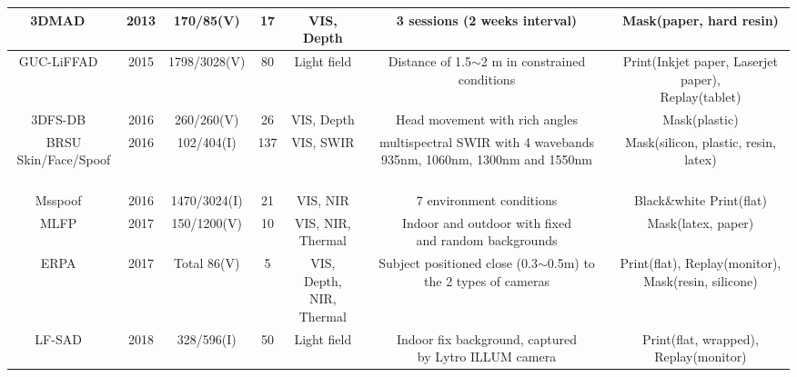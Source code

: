 \documentclass[10pt,journal,compsoc]{IEEEtran}
\begin{document}
\begin{table}
{\begin{tabular}{c c c c c c c}
 \midrule[1pt]
 \midrule[1pt]
 
3DMAD
~\cite{erdogmus2014spoofing} & 2013 & 170/85(V) & 17 & VIS, Depth &  3 sessions (2 weeks
interval)  & Mask(paper, hard resin)\\

 \midrule
GUC-LiFFAD
~\cite{raghavendra2015presentation} & 2015 & 1798/3028(V) & 80 & Light field &  \tabincell{c}{Distance of 1.5$\sim$2 m in \\constrained conditions}  & \tabincell{c}{Print(Inkjet paper, Laserjet paper),\\ Replay(tablet)}\\

\midrule
3DFS-DB
~\cite{galbally2016three} & 2016 & 260/260(V) & 26 & VIS, Depth &  Head movement with rich angles & Mask(plastic)\\

 \midrule
\tabincell{c}{BRSU \\ Skin/Face/Spoof}
~\cite{steiner2016reliable} & 2016 & 102/404(I) & 137 & VIS, SWIR &  \tabincell{c}{ multispectral SWIR with 4 wavebands \\935nm, 1060nm, 1300nm and 1550nm} & Mask(silicon, plastic, resin, latex)\\

 \midrule
Msspoof
~\cite{chingovska2016face} & 2016 & 1470/3024(I) & 21 & VIS, NIR &  7 environment conditions & Black\&white Print(flat)\\


 \midrule
MLFP
~\cite{agarwal2017face} & 2017 & 150/1200(V) & 10 & \tabincell{c}{VIS, NIR, \\Thermal} &  \tabincell{c}{Indoor and outdoor with fixed\\ and random backgrounds} & Mask(latex, paper)\\

 \midrule
ERPA
~\cite{bhattacharjee2017you} & 2017 & Total 86(V) & 5 & \tabincell{c}{VIS, Depth, \\NIR, Thermal} &  \tabincell{c}{Subject positioned close (0.3$\sim$0.5m)\\ to the 2 types of cameras} & \tabincell{c}{Print(flat), Replay(monitor), \\ Mask(resin, silicone)}\\


 \midrule
LF-SAD
~\cite{liu2019light} & 2018 &  328/596(I)  & 50 & Light field &  \tabincell{c}{Indoor fix background, captured\\ by Lytro ILLUM camera}  & Print(flat, wrapped), Replay(monitor)\\



\end{tabular}}
\end{table}
\end{document}
